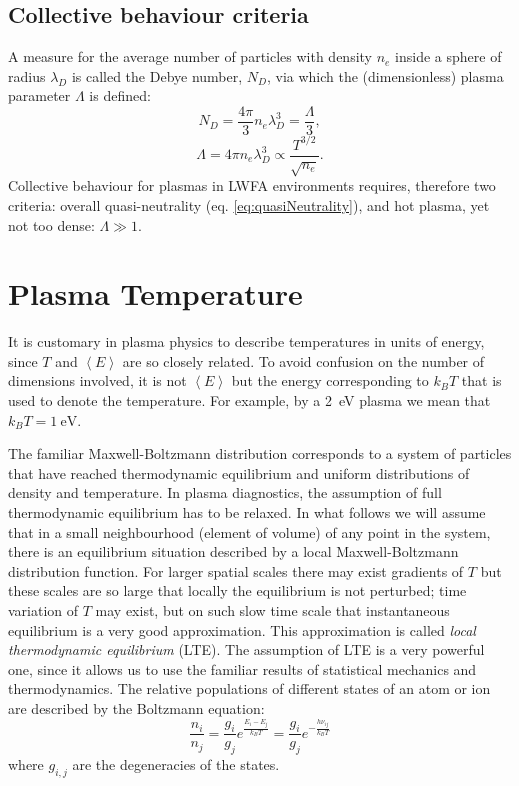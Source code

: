 \documentclass[justified,nofonts,nobib,openany]{tufte-book}
\begin{document}
\subsection{Collective behaviour criteria}
A measure for the average number of particles with density $n_e$ inside a sphere of radius $\lambda_D$ is called the Debye number, $N_D$, via which the (dimensionless) plasma parameter $\Lambda$ is defined:
$$
    N_D=\frac{4\pi}{3}n_e \lambda_D^3=\frac{\Lambda}{3},
$$
\begin{equation}
    \Lambda=4\pi n_e \lambda_D^3 \propto \frac{T^{3/2}}{\sqrt{n_e}}.
\end{equation}
Collective behaviour for plasmas in LWFA environments requires, therefore two criteria: overall quasi-neutrality (eq. \ref{eq:quasiNeutrality}), and hot plasma, yet not too dense: $\Lambda \gg 1$.


\section{Plasma Temperature}
It is customary in plasma physics to describe temperatures in units of energy, since $T$ and $\left<E\right>$ are so closely related. To avoid confusion on the number of dimensions involved, it is not $\left<E\right>$ but the energy corresponding to $k_B T$ that is used to denote the temperature. For example, by a \SI{2}{\electronvolt} plasma we mean that $k_B T = \SI{1}{\electronvolt}$.

The familiar Maxwell-Boltzmann distribution corresponds to a system of particles that have reached thermodynamic equilibrium and uniform distributions of density and temperature. In plasma diagnostics, the assumption of full thermodynamic equilibrium has to be relaxed. In what follows we will assume that in a small neighbourhood (element of volume) of any point in the system, there is an equilibrium situation described by a local Maxwell-Boltzmann distribution function. For larger spatial scales there may exist gradients of $T$ but these scales are so large that locally the equilibrium is not perturbed; time variation of $T$ may exist, but on such slow time scale that instantaneous equilibrium is a very good approximation. This approximation is  called \emph{local thermodynamic equilibrium} (LTE). The assumption of LTE is a very powerful one, since it allows us to use the familiar results of statistical mechanics and thermodynamics. The relative populations of different states of an atom or ion are described by the Boltzmann equation:
\begin{equation}
		\frac{n_i}{n_j}=\frac{g_i}{g_j}e^{\frac{E_i-E_j}{k_B T}}=\frac{g_i}{g_j}e^{-\frac{h\nu_{ij}}{k_B T}}
\end{equation}
where $g_{i,j}$ are the degeneracies of the states. 
\end{document}
